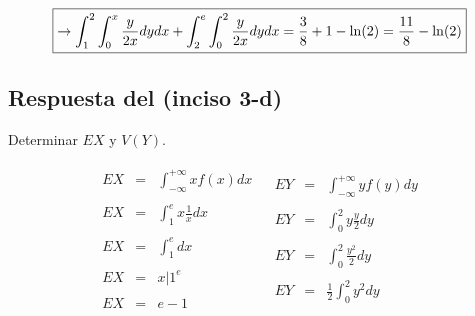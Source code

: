 \documentclass[12pt]{article}
\begin{document}
    \begin{equation*}
        \fbox{$\to\displaystyle\int_{1}^{2}\int_{0}^{x}\frac{y}{2x}dy dx  + \int_{2}^{e}\int_{0}^{2}\frac{y}{2x}dy dx = \frac{3}{8} + 1 - \ln(2) = \frac{11}{8}-\ln(2) $}
    \end{equation*}  
        
    \subsection*{Respuesta del (inciso 3-d)} 
    \begin{flushleft}
        Determinar $EX$  y $V(Y)$.
    \end{flushleft}
    \begin{center}
        \begin{equation*}
		    \begin{array}{c|c}
		        \begin{array}{rcl}
                    EX & = & \displaystyle\int_{-\infty}^{+\infty} x f(x)dx
                    \\
                    \\
                    EX & = & \displaystyle\int_{1}^{e} x \frac{1}{x}dx
                    \\
                    \\
                    EX & = & \displaystyle\int_{1}^{e} dx
                    \\
                    \\
                    EX & = & \displaystyle x\vert{1}^{e}
                    \\
                    \\
                    EX & = & \displaystyle e-1
                \end{array}
                 &
                \begin{array}{rcl}
                    EY & = & \displaystyle\int_{-\infty}^{+\infty}yf(y)dy 
                    \\
                    \\
                    EY & = & \displaystyle\int_{0}^{2}y\frac{y}{2}dy 
                    \\
                    \\
                    EY & = & \displaystyle\int_{0}^{2}\frac{y^2}{2}dy 
                    \\
                    \\
                    EY & = & \displaystyle\frac{1}{2}\int_{0}^{2} y^2dy

\end{array}
\end{array}
\end{equation*}
\end{center}
\end{document}
